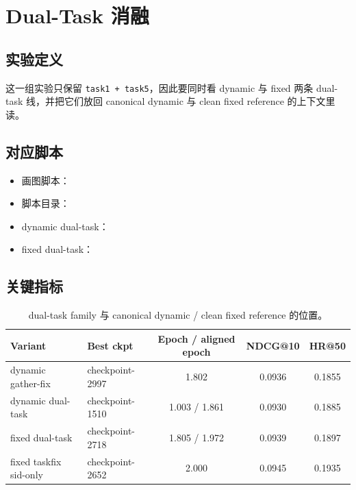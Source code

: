 \section{Dual-Task 消融}

\subsection{实验定义}

这一组实验只保留 \texttt{task1 + task5}，因此要同时看 dynamic 与 fixed 两条 dual-task 线，并把它们放回 canonical dynamic 与 clean fixed reference 的上下文里读。

\subsection{对应脚本}

{\footnotesize
\begin{itemize}
\item 画图脚本：
\item 脚本目录：
\item dynamic dual-task：
\item fixed dual-task：
\end{itemize}
}

\subsection{关键指标}

\begin{table}[H]
\centering
\small
\setlength{\tabcolsep}{4pt}
\begin{tabular}{p{4.0cm} p{2.4cm} c c c}
\toprule
Variant & Best ckpt & Epoch / aligned epoch & NDCG@10 & HR@50 \\
\midrule
dynamic gather-fix & checkpoint-2997 & 1.802 & 0.0936 & 0.1855 \\
dynamic dual-task & checkpoint-1510 & 1.003 / 1.861 & 0.0930 & 0.1885 \\
fixed dual-task & checkpoint-2718 & 1.805 / 1.972 & 0.0939 & 0.1897 \\
fixed taskfix sid-only & checkpoint-2652 & 2.000 & 0.0945 & 0.1935 \\
\bottomrule
\end{tabular}
\caption{dual-task family 与 canonical dynamic / clean fixed reference 的位置。}
\end{table}

